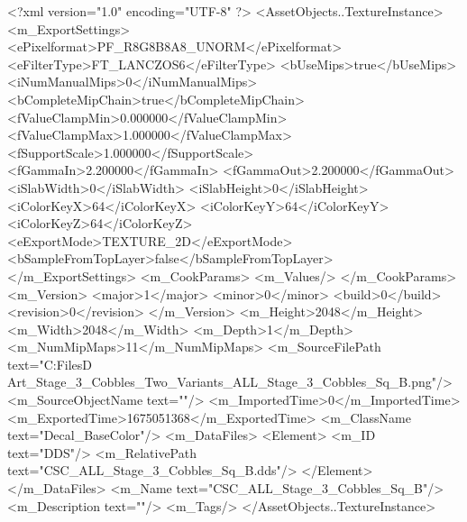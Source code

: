 <?xml version="1.0" encoding="UTF-8" ?>
<AssetObjects..TextureInstance>
	<m_ExportSettings>
		<ePixelformat>PF_R8G8B8A8_UNORM</ePixelformat>
		<eFilterType>FT_LANCZOS6</eFilterType>
		<bUseMips>true</bUseMips>
		<iNumManualMips>0</iNumManualMips>
		<bCompleteMipChain>true</bCompleteMipChain>
		<fValueClampMin>0.000000</fValueClampMin>
		<fValueClampMax>1.000000</fValueClampMax>
		<fSupportScale>1.000000</fSupportScale>
		<fGammaIn>2.200000</fGammaIn>
		<fGammaOut>2.200000</fGammaOut>
		<iSlabWidth>0</iSlabWidth>
		<iSlabHeight>0</iSlabHeight>
		<iColorKeyX>64</iColorKeyX>
		<iColorKeyY>64</iColorKeyY>
		<iColorKeyZ>64</iColorKeyZ>
		<eExportMode>TEXTURE_2D</eExportMode>
		<bSampleFromTopLayer>false</bSampleFromTopLayer>
	</m_ExportSettings>
	<m_CookParams>
		<m_Values/>
	</m_CookParams>
	<m_Version>
		<major>1</major>
		<minor>0</minor>
		<build>0</build>
		<revision>0</revision>
	</m_Version>
	<m_Height>2048</m_Height>
	<m_Width>2048</m_Width>
	<m_Depth>1</m_Depth>
	<m_NumMipMaps>11</m_NumMipMaps>
	<m_SourceFilePath text="C:\Users\Shadow\Desktop\Working Files\3D Art\Decals\CSC_Stage_3_Cobbles_Two_Variants\square\textures\CSC_ALL_Stage_3_Cobbles_Sq_B.png"/>
	<m_SourceObjectName text=""/>
	<m_ImportedTime>0</m_ImportedTime>
	<m_ExportedTime>1675051368</m_ExportedTime>
	<m_ClassName text="Decal_BaseColor"/>
	<m_DataFiles>
		<Element>
			<m_ID text="DDS"/>
			<m_RelativePath text="CSC_ALL_Stage_3_Cobbles_Sq_B.dds"/>
		</Element>
	</m_DataFiles>
	<m_Name text="CSC_ALL_Stage_3_Cobbles_Sq_B"/>
	<m_Description text=""/>
	<m_Tags/>
</AssetObjects..TextureInstance>

